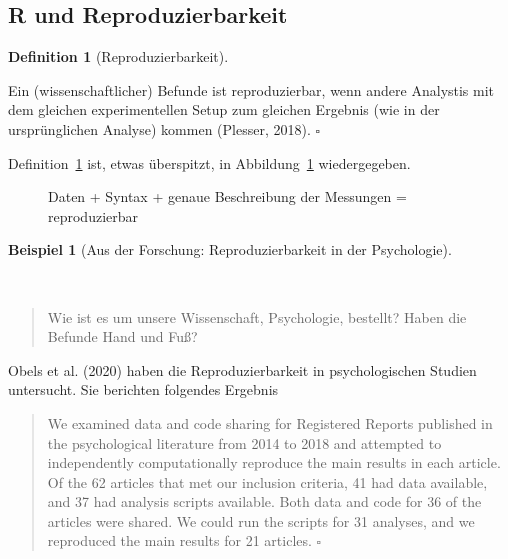 \documentclass[
  letterpaper,
]{scrbook}
\theoremstyle{definition}
\newtheorem{example}{Beispiel}[chapter]
\theoremstyle{definition}
\newtheorem{definition}{Definition}[chapter]
\theoremstyle{definition}
\theoremstyle{remark}
\begin{document}
\subsection{R und Reproduzierbarkeit}\label{r-und-reproduzierbarkeit}

\begin{definition}[Reproduzierbarkeit]\protect\hypertarget{def-repro}{}\label{def-repro}

Ein (wissenschaftlicher) Befunde ist reproduzierbar, wenn andere
Analystis mit dem gleichen experimentellen Setup zum gleichen Ergebnis
(wie in der ursprünglichen Analyse) kommen (Plesser, 2018). \(\square\)

\end{definition}

Definition~\ref{def-repro} ist, etwas überspitzt, in
Abbildung~\ref{fig-repro} wiedergegeben.

\begin{figure}


\caption{\label{fig-repro}Daten + Syntax + genaue Beschreibung der
Messungen = reproduzierbar}

\end{figure}%

\begin{example}[Aus der Forschung: Reproduzierbarkeit in der
Psychologie]\protect\hypertarget{exm-repro}{}\label{exm-repro}

~

\begin{quote}
{} Wie ist es um unsere Wissenschaft, Psychologie,
bestellt? Haben die Befunde Hand und Fuß?
\end{quote}

Obels et al. (2020) haben die Reproduzierbarkeit in psychologischen
Studien untersucht. Sie berichten folgendes Ergebnis

\begin{quote}
We examined data and code sharing for Registered Reports published in
the psychological literature from 2014 to 2018 and attempted to
independently computationally reproduce the main results in each
article. Of the 62 articles that met our inclusion criteria, 41 had data
available, and 37 had analysis scripts available. Both data and code for
36 of the articles were shared. We could run the scripts for 31
analyses, and we reproduced the main results for 21 articles.
\(\square\)
\end{quote}

\end{example}
\end{document}
